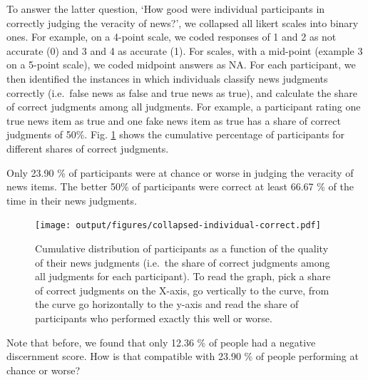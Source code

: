 \documentclass[
  man]{apa6}
\begin{document}
To answer the latter question, `How good were individual participants in correctly judging the veracity of news?', we collapsed all likert scales into binary ones. For example, on a 4-point scale, we coded responses of 1 and 2 as not accurate (0) and 3 and 4 as accurate (1). For scales, with a mid-point (example 3 on a 5-point scale), we coded midpoint answers as NA. For each participant, we then identified the instances in which individuals classify news judgments correctly (i.e.~false news as false and true news as true), and calculate the share of correct judgments among all judgments. For example, a participant rating one true news item as true and one fake news item as true has a share of correct judgments of 50\%. Fig. \ref{fig:collapsed-individual-correct} shows the cumulative percentage of participants for different shares of correct judgments.

Only 23.90 \% of participants were at chance or worse in judging the veracity of news items. The better 50\% of participants were correct at least 66.67 \% of the time in their news judgments.



\begin{figure}
\centering
\texttt{[image: output/figures/collapsed-individual-correct.pdf]}
\caption{\label{fig:collapsed-individual-correct}Cumulative distribution of participants as a function of the quality of their news judgments (i.e.~the share of correct judgments among all judgments for each participant). To read the graph, pick a share of correct judgments on the X-axis, go vertically to the curve, from the curve go horizontally to the y-axis and read the share of participants who performed exactly this well or worse.}
\end{figure}

Note that before, we found that only 12.36 \% of people had a negative discernment score. How is that compatible with 23.90 \% of people performing at chance or worse?
\end{document}
